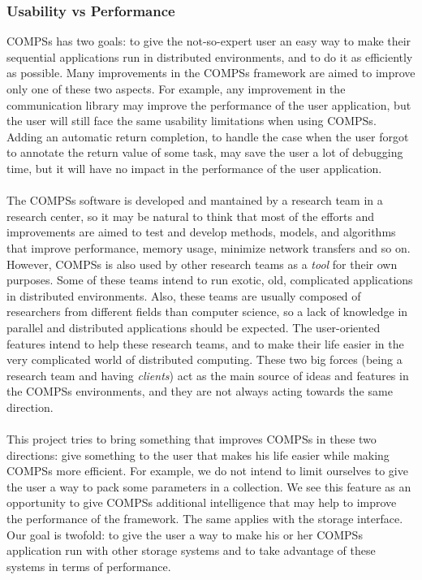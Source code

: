\subsubsection{Usability vs Performance}
\label{subsec:compss_ux_vs_perf}
COMPSs has two goals: to give the not-so-expert user an easy way to make their sequential applications run in distributed environments, and to do it as efficiently as possible. Many improvements in the COMPSs framework are aimed to improve only one of these two aspects. For example, any improvement in the communication library may improve the performance of the user application, but the user will still face the same usability limitations when using COMPSs. Adding an automatic return completion, to handle the case when the user forgot to annotate the return value of some task, may save the user a lot of debugging time, but it will have no impact in the performance of the user application.\\
\\
The COMPSs software is developed and mantained by a research team in a research center, so it may be natural to think that most of the efforts and improvements are aimed to test and develop methods, models, and algorithms that improve performance, memory usage, minimize network transfers and so on. However, COMPSs is also used by other research teams as a \textit{tool} for their own purposes. Some of these teams intend to run exotic, old, complicated applications in distributed environments. Also, these teams are usually composed of researchers from different fields than computer science, so a lack of knowledge in parallel and distributed applications should be expected. The user-oriented features intend to help these research teams, and to make their life easier in the very complicated world of distributed computing. These two big forces (being a research team and having \textit{clients}) act as the main source of ideas and features in the COMPSs environments, and they are not always acting towards the same direction.\\
\\
This project tries to bring something that improves COMPSs in these two directions: give something to the user that makes his life easier while making COMPSs more efficient. For example, we do not intend to limit ourselves to give the user a way to pack some parameters in a collection. We see this feature as an opportunity to give COMPSs additional intelligence that may help to improve the performance of the framework. The same applies with the storage interface. Our goal is twofold: to give the user a way to make his or her COMPSs application run with other storage systems and to take advantage of these systems in terms of performance.
